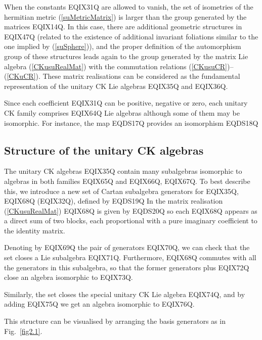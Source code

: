 When the constants EQIX31Q are allowed to vanish, the set of
isometries of the hermitian metric (\ref{suMetricMatrix}) is larger
than the group generated by the matrices
EQIX14Q. In this case, there are additional
geometric structures in EQIX47Q (related to the existence of
additional invariant foliations similar to the one implied by
(\ref{suSphere})), and the proper definition of the automorphism
group of these structures leads again to the group generated by the
matrix Lie algebra (\ref{CKusuRealMat}) with the commutation relations
 (\ref{CKusuCR})--(\ref{CKuCR}). These matrix
realisations can be considered as the fundamental representation of
the  unitary CK Lie algebras
EQIX35Q and EQIX36Q.

Since each coefficient EQIX31Q can be positive, negative or zero,
each unitary CK family comprises  EQIX64Q Lie algebras  although some of
them may be isomorphic. For instance, the map
EQDS17Q
provides an isomorphism
EQDS18Q

\subsection{Structure of the unitary CK algebras}

The  unitary CK algebras EQIX35Q contain many subalgebras
isomorphic to algebras in both families EQIX65Q and
EQIX66Q, EQIX67Q. To best describe this,  we introduce a new set
of Cartan subalgebra generators for EQIX35Q,
EQIX68Q (EQIX32Q), defined by
EQDS19Q
In the matrix realisation (\ref{CKusuRealMat}) EQIX68Q is given by
EQDS20Q
so each EQIX68Q appears as a direct sum of two blocks,
each proportional with a pure imaginary coefficient to the identity matrix.

Denoting by EQIX69Q the pair of generators
EQIX70Q, we can check that the set 
closes a Lie subalgebra
EQIX71Q.
Furthermore,
EQIX68Q commutes with all the generators in this subalgebra, so that
the former generators plus EQIX72Q close an algebra isomorphic to
EQIX73Q.

Similarly, the set  closes the  special unitary CK Lie algebra
EQIX74Q, and by adding EQIX75Q we
get an algebra isomorphic to EQIX76Q.

This structure can be visualised by arranging the basis generators
as in Fig.~\ref{fig2.1}.


